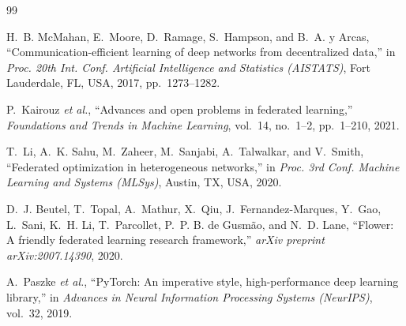 \documentclass[conference]{IEEEtran}
\begin{document}
\begin{thebibliography}{99}

H.~B. McMahan, E.~Moore, D.~Ramage, S.~Hampson, and B.~A. y Arcas,
``Communication-efficient learning of deep networks from decentralized data,''
in \emph{Proc. 20th Int. Conf. Artificial Intelligence and Statistics (AISTATS)},
Fort Lauderdale, FL, USA, 2017, pp.~1273--1282.

P.~Kairouz \emph{et al.},
``Advances and open problems in federated learning,''
\emph{Foundations and Trends in Machine Learning}, vol.~14, no.~1--2,
pp.~1--210, 2021.

T.~Li, A.~K. Sahu, M.~Zaheer, M.~Sanjabi, A.~Talwalkar, and V.~Smith,
``Federated optimization in heterogeneous networks,''
in \emph{Proc. 3rd Conf. Machine Learning and Systems (MLSys)},
Austin, TX, USA, 2020.

D.~J. Beutel, T.~Topal, A.~Mathur, X.~Qiu, J.~Fernandez-Marques,
Y.~Gao, L.~Sani, K.~H. Li, T.~Parcollet, P.~P. B. de Gusm\~ao, and N.~D. Lane,
``Flower: A friendly federated learning research framework,''
\emph{arXiv preprint arXiv:2007.14390}, 2020.

A.~Paszke \emph{et al.},
``PyTorch: An imperative style, high-performance deep learning library,''
in \emph{Advances in Neural Information Processing Systems (NeurIPS)},
vol.~32, 2019.

\end{thebibliography}
\end{document}
